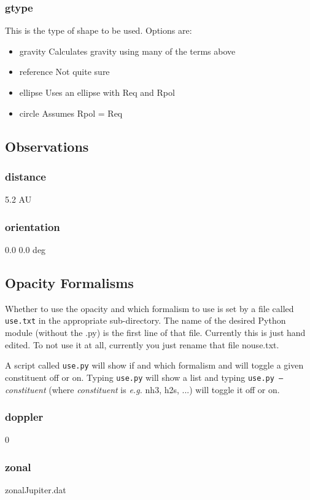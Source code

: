 \documentclass[11pt]{article}
\begin{document}
\subsubsection{gtype}
This is the type of shape to be used.  Options are:

\begin{itemize}
\item{gravity} Calculates gravity using many of the terms above
\item{reference} Not quite sure
\item{ellipse} Uses an ellipse with Req and Rpol
\item{circle} Assumes Rpol = Req
\end{itemize}

\subsection{Observations}
\subsubsection{distance}
5.2 AU
\subsubsection{orientation}
0.0 0.0 deg

\subsection{Opacity Formalisms}
Whether to use the opacity and which formalism to use is set by a file called {\tt use.txt} in the appropriate sub-directory.  The name of the desired Python module (without the .py) is the first line of that file.  Currently this is just hand edited.  To not use it at all, currently you just rename that file nouse.txt.

A script called {\tt use.py} will show if and which formalism and will toggle a given constituent off or on.  Typing {\tt use.py} will show a list and typing {\tt use.py --}{\em constituent} (where {\em constituent} is {\em e.g.} nh3, h2s, ...) will toggle it off or on.


\subsubsection{doppler}
0

\subsubsection{zonal}
    zonalJupiter.dat
\end{document}
